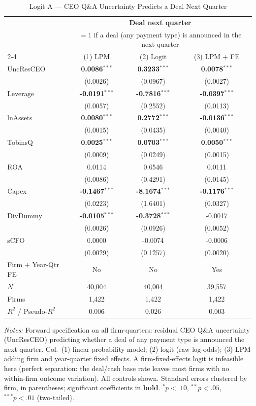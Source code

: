 \begin{table}[htbp]\centering
\caption{Logit A --- CEO Q\&A Uncertainty Predicts a Deal Next Quarter}
\label{tab:logit_dealnext}
\small\begin{tabular}{lccc}
\toprule
 & \multicolumn{3}{c}{\textbf{Deal next quarter}} \\
 & \multicolumn{3}{c}{\scriptsize $=1$ if a deal (any payment type) is announced in the next quarter} \\
\cmidrule(lr){2-4}
 & (1) LPM & (2) Logit & (3) LPM + FE \\
\midrule
UncResCEO & \textbf{0.0086}$^{***}$ & \textbf{0.3233}$^{***}$ & \textbf{0.0078}$^{***}$ \\
 & (0.0026) & (0.0967) & (0.0027) \\
\midrule
Leverage & \textbf{-0.0191}$^{***}$ & \textbf{-0.7816}$^{***}$ & \textbf{-0.0397}$^{***}$ \\
 & (0.0057) & (0.2552) & (0.0113) \\
lnAssets & \textbf{0.0080}$^{***}$ & \textbf{0.2772}$^{***}$ & \textbf{-0.0136}$^{***}$ \\
 & (0.0015) & (0.0435) & (0.0040) \\
TobinsQ & \textbf{0.0025}$^{***}$ & \textbf{0.0703}$^{***}$ & \textbf{0.0050}$^{***}$ \\
 & (0.0009) & (0.0249) & (0.0015) \\
ROA & 0.0114 & 0.6546 & 0.0111 \\
 & (0.0086) & (0.4291) & (0.0145) \\
Capex & \textbf{-0.1467}$^{***}$ & \textbf{-8.1674}$^{***}$ & \textbf{-0.1176}$^{***}$ \\
 & (0.0223) & (1.6401) & (0.0327) \\
DivDummy & \textbf{-0.0105}$^{***}$ & \textbf{-0.3728}$^{***}$ & -0.0017 \\
 & (0.0026) & (0.0926) & (0.0052) \\
sCFO & 0.0000 & -0.0074 & -0.0006 \\
 & (0.0029) & (0.1257) & (0.0020) \\
\midrule
Firm + Year-Qtr FE & No & No & Yes \\
$N$ & 40,004 & 40,004 & 39,557 \\
Firms & 1,422 & 1,422 & 1,422 \\
$R^2$ / Pseudo-$R^2$ & 0.006 & 0.026 & 0.003 \\
\bottomrule\end{tabular}
\begin{minipage}{\linewidth}\vspace{2pt}\scriptsize\textit{Notes:} Forward specification on all firm-quarters: residual CEO Q\&A uncertainty (UncResCEO) predicting whether a deal of any payment type is announced the next quarter. Col.\ (1) linear probability model; (2) logit (raw log-odds); (3) LPM adding firm and year-quarter fixed effects. A firm-fixed-effects logit is infeasible here (perfect separation: the deal/cash base rate leaves most firms with no within-firm outcome variation). All controls shown. Standard errors clustered by firm, in parentheses; significant coefficients in \textbf{bold}. $^{*}p<.10$, $^{**}p<.05$, $^{***}p<.01$ (two-tailed).\end{minipage}
\end{table}
